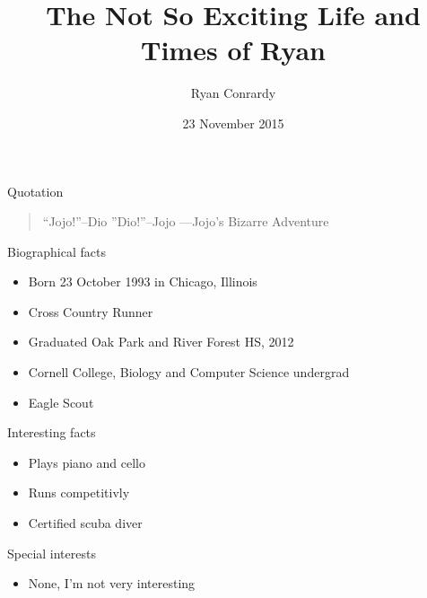 \documentclass{beamer}
\title{The Not So Exciting Life and Times of Ryan}
\author{Ryan Conrardy}
\institute{Cornell College}
\date{23 November 2015}
\begin{document}
\begin{frame}
  \titlepage
\end{frame}

\begin{frame}{Quotation}
\begin{quotation}
\noindent
``Jojo!''--Dio  ''Dio!''--Jojo
  \flushright
  ---Jojo's Bizarre Adventure
  \end{quotation}
\end{frame}

\begin{frame}{Biographical facts}
\begin{itemize}
  \item Born 23 October 1993 in Chicago, Illinois
  \item Cross Country Runner
  \item Graduated Oak Park and River Forest HS, 2012
  \item Cornell College, Biology and Computer Science undergrad
  \item Eagle Scout
  \end{itemize}
\end{frame}

\begin{frame}{Interesting facts}
\begin{itemize}
  \item Plays piano and cello
  \item Runs competitivly
  \item Certified scuba diver
  \end{itemize}
\end{frame}

\begin{frame}{Special interests}
\begin{itemize}
  \item None, I'm not very interesting
  \end{itemize}
\end{frame}
\end{document}
